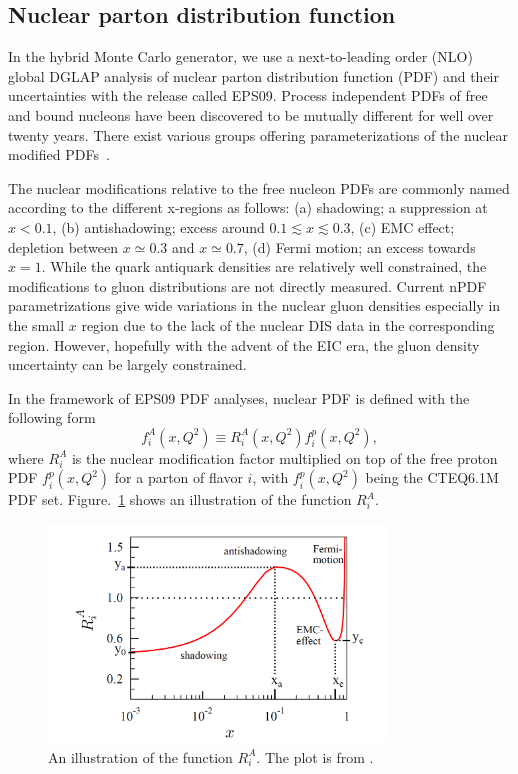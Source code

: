 \subsection{Nuclear parton distribution function}
In the hybrid Monte Carlo generator, we use a next-to-leading order (NLO) global
DGLAP analysis of nuclear parton distribution function (PDF) and their uncertainties with the release called
EPS09. Process independent PDFs of free and bound nucleons
have been discovered to be mutually different for well over twenty years. There
exist various groups offering parameterizations of the nuclear modified PDFs~\cite{Hirai:2004wq,deFlorian:2003qf}.


The nuclear modifications relative to the free nucleon PDFs are commonly named
according to the different x-regions as follows: (a) shadowing; a suppression at
$x\less 0.1$, (b) antishadowing; excess around $0.1\lesssim x \lesssim 0.3$,
(c) EMC effect; depletion between $x\simeq 0.3$ and $x \simeq 0.7$, (d) Fermi
motion; an excess towards $x=1$. While the quark antiquark densities are
relatively well constrained, the modifications to gluon distributions are not
directly measured. Current nPDF parametrizations give wide variations in the
nuclear gluon densities especially in the small $x$ region due to the lack of the
nuclear DIS data in the corresponding region. However, hopefully with the advent
of the EIC era, the gluon density uncertainty can be largely constrained.

In the framework of EPS09 PDF analyses, nuclear PDF is defined with the following form
\begin{equation}
f^{A}_{i}(x, Q^{2}) \equiv R^{A}_{i}(x, Q^{2})f^{p}_{i}(x, Q^{2}),
\end{equation} 
where $R^{A}_{i}$ is the nuclear modification factor multiplied on top of the
free proton PDF $f^{p}_{i}(x, Q^{2})$ for a parton of flavor $i$, 
with $f^{p}_{i}(x, Q^{2})$ being the CTEQ6.1M PDF set. Figure.~\ref{fig:shadowing} shows an illustration of the function $R^{A}_{i}$. 
\begin{figure}
\centering
\includegraphics[width=0.8\textwidth]{plots/chpt5/shadowing.png} 
\caption[The plot showing the ratio of parton distribution function in the nuclear medium divided by the proton gluon distribution function] {
An illustration of the function $R^{A}_{i}$. The plot is from \cite{Eskola:2009uj}.}
\label{fig:shadowing}
\end{figure}



